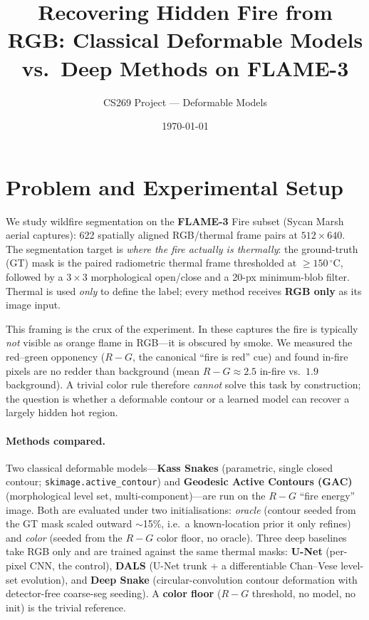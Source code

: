 \documentclass[10pt]{article}
\title{\vspace{-2.5em}Recovering Hidden Fire from RGB: Classical Deformable Models
vs.\ Deep Methods on FLAME-3}
\author{CS269 Project --- Deformable Models}
\date{\today}
\begin{document}
\maketitle
\vspace{-1.5em}

\section{Problem and Experimental Setup}

We study wildfire segmentation on the \textbf{FLAME-3} Fire subset (Sycan Marsh
aerial captures): 622 spatially aligned RGB/thermal frame pairs at
$512\times640$. The segmentation target is \emph{where the fire actually is
thermally}: the ground-truth (GT) mask is the paired radiometric thermal frame
thresholded at $\ge 150\,^\circ$C, followed by a $3\times3$ morphological
open/close and a 20-px minimum-blob filter. Thermal is used \emph{only} to
define the label; every method receives \textbf{RGB only} as its image input.

This framing is the crux of the experiment. In these captures the fire is
typically \emph{not} visible as orange flame in RGB---it is obscured by smoke.
We measured the red--green opponency ($R\!-\!G$, the canonical ``fire is red''
cue) and found in-fire pixels are no redder than background (mean
$R\!-\!G\approx2.5$ in-fire vs.\ $1.9$ background). A trivial color rule therefore
\emph{cannot} solve this task by construction; the question is whether a
deformable contour or a learned model can recover a largely hidden hot region.

\paragraph{Methods compared.} Two classical deformable models---\textbf{Kass
Snakes} (parametric, single closed contour; \texttt{skimage.active\_contour})
and \textbf{Geodesic Active Contours (GAC)} (morphological level set,
multi-component)---are run on the $R\!-\!G$ ``fire energy'' image. Both are
evaluated under two initialisations: \emph{oracle} (contour seeded from the GT
mask scaled outward $\sim$15\%, i.e.\ a known-location prior it only refines) and
\emph{color} (seeded from the $R\!-\!G$ color floor, no oracle). Three deep
baselines take RGB only and are trained against the same thermal masks:
\textbf{U-Net} (per-pixel CNN, the control), \textbf{DALS} (U-Net trunk + a
differentiable Chan--Vese level-set evolution), and \textbf{Deep Snake}
(circular-convolution contour deformation with detector-free coarse-seg
seeding). A \textbf{color floor} ($R\!-\!G$ threshold, no model, no init) is the
trivial reference.
\end{document}
